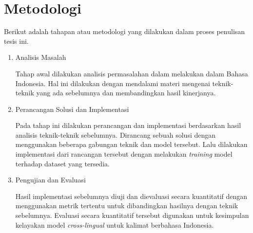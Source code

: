 \section{Metodologi}

Berikut adalah tahapan atau metodologi yang dilakukan dalam proses penulisan tesis ini.

\begin{enumerate}
  \item Analisis Masalah
  
  Tahap awal dilakukan analisis permasalahan dalam melakukan \amrparsing{} dalam Bahasa Indonesia.
  Hal ini dilakukan dengan mendalami materi mengenai teknik-teknik \amrparsing{} yang ada sebelumnya dan membandingkan hasil kinerjanya.

  \item Perancangan Solusi dan Implementasi
  
  Pada tahap ini dilakukan perancangan dan implementasi berdasarkan hasil analisis teknik-teknik \amrparsing{} sebelumnya.
  Dirancang sebuah solusi dengan menggunakan beberapa gabungan teknik dan model tersebut.
  Lalu dilakukan implementasi dari rancangan tersebut dengan melakukan \textit{training} model terhadap dataset yang tersedia.

  \item Pengujian dan Evaluasi
  
  Hasil implementasi sebelumnya diuji dan dievaluasi secara kuantitatif dengan menggunakan metrik tertentu untuk dibandingkan hasilnya dengan teknik sebelumnya.
  Evaluasi secara kuantitatif
  tersebut digunakan untuk kesimpulan kelayakan model \amrparsing{} \textit{cross-lingual} untuk kalimat berbahasa Indonesia.
  
\end{enumerate}
